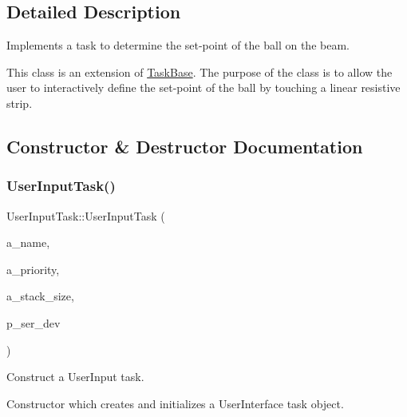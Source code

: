 \subsection{Detailed Description}
Implements a task to determine the set-\/point of the ball on the beam. 

This class is an extension of {\ttfamily \mbox{\hyperlink{class_task_base}{Task\+Base}}}. The purpose of the class is to allow the user to interactively define the set-\/point of the ball by touching a linear resistive strip. 

\subsection{Constructor \& Destructor Documentation}
\mbox{\label{class_user_input_task_a46e07c6b7e8d143761f8a747c80a73f3}} 
\subsubsection{\texorpdfstring{User\+Input\+Task()}{UserInputTask()}}
{\footnotesize\ttfamily User\+Input\+Task\+::\+User\+Input\+Task (\begin{DoxyParamCaption}\item[{const char $\ast$}]{a\+\_\+name,  }\item[{unsigned port\+B\+A\+S\+E\+\_\+\+T\+Y\+PE}]{a\+\_\+priority,  }\item[{size\+\_\+t}]{a\+\_\+stack\+\_\+size,  }\item[{\mbox{\hyperlink{classemstream}{emstream}} $\ast$}]{p\+\_\+ser\+\_\+dev }\end{DoxyParamCaption})}



Construct a User\+Input task. 

Constructor which creates and initializes a User\+Interface task object.

